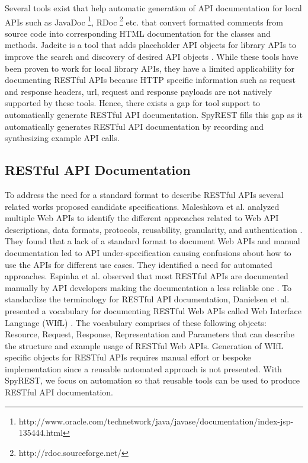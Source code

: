 \documentclass[conference]{IEEEtran}
\begin{document}
Several tools exist that help automatic generation of API documentation for local APIs such as JavaDoc \footnote{http://www.oracle.com/technetwork/java/javase/documentation/index-jsp-135444.html}, RDoc \footnote{http://rdoc.sourceforge.net/} etc. that convert formatted comments from source code into corresponding HTML documentation for the classes and methods. Jadeite is a tool that adds placeholder API objects for library APIs to improve the search and discovery of desired API objects \cite{Jadeite}. While these tools have been proven to work for local library APIs, they have a limited applicability for documenting RESTful APIs because HTTP specific information such as request and response headers, url, request and response payloads are not natively supported by these tools. Hence, there exists a gap for tool support to automatically generate RESTful API documentation. SpyREST fills this gap as it automatically generates RESTful API documentation by recording and synthesizing example API calls.

\subsection{RESTful API Documentation} %
\label{sub:restful_api_documentation}

To address the need for a standard format to describe RESTful APIs several related works proposed candidate specifications. Maleshkova et al. analyzed multiple Web APIs to identify the different approaches related to Web API descriptions, data formats, protocols, reusability, granularity, and authentication \cite{Maleshkova_investigating}. They found that a lack of a standard format to document Web APIs and manual documentation led to API under-specification causing confusions about how to use the APIs for different use cases. They identified a need for automated approaches. Espinha et al. observed that most RESTful APIs are documented manually by API developers making the documentation a less reliable one \cite{Espinha_web}. To standardize the terminology for RESTful API documentation, Danielsen et al. presented a vocabulary for documenting RESTful Web APIs called Web Interface Language (WIfL) \cite{Danielsen_validation}. The vocabulary comprises of these following objects: Resource, Request, Response, Representation and Parameters that can describe the structure and example usage of RESTful Web APIs. Generation of WIfL specific objects for RESTful APIs requires manual effort or bespoke implementation since a reusable automated approach is not presented. With SpyREST, we focus on automation so that reusable tools can be used to produce RESTful API documentation.
\end{document}
